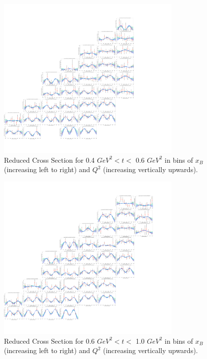     \begin{figure}[ht]
        \centering
        \includegraphics[trim={14.6cm 4cm 27.2cm 4cm},clip,width=0.8\textwidth]{Chapters/Ch5-Further/c12xsec/combined_t0.4.png}
        \caption[Reduced Cross Section for 0.4 $GeV^2 < t <$ 0.6 $ GeV^2$]{Reduced Cross Section for 0.4 $ GeV^2 < t <$ 0.6 $GeV^2$ in bins of $x_B$ (increasing left to right) and $Q^2$ (increasing vertically upwards). }
        \label{fig:combined_t0.4}
    \end{figure}
    
    \begin{figure}[ht]
        \centering
        \includegraphics[trim={14.6cm 4cm 15.2cm 4cm},clip,width=0.8\textwidth]{Chapters/Ch5-Further/c12xsec/combined_t0.6.png}
        \caption[Reduced Cross Section for 0.6 $GeV^2 < t <$ 1.0 $ GeV^2$]{Reduced Cross Section for 0.6 $ GeV^2 < t <$ 1.0 $GeV^2$ in bins of $x_B$ (increasing left to right) and $Q^2$ (increasing vertically upwards). }
        \label{fig:combined_t0.6}
    \end{figure}
    
